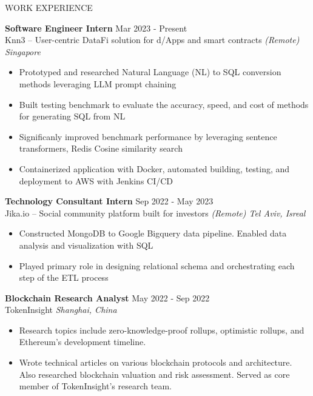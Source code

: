 \documentclass{cv} %
\begin{document}
\begin{rSection}{WORK EXPERIENCE}

	\textbf{Software Engineer Intern} \hfill Mar 2023 - Present\\
	Knn3 – User-centric DataFi solution for d/Apps and smart contracts  \hfill \textit{(Remote) Singapore}
	\begin{itemize}
		\item Prototyped and researched Natural Language (NL) to SQL conversion methods leveraging LLM prompt chaining
		\item Built testing benchmark to evaluate the accuracy, speed, and cost of methods for generating SQL from NL
		\item Significanly improved benchmark performance by leveraging sentence transformers, Redis Cosine similarity search
		\item Containerized application with Docker, automated building, testing, and deployment to AWS with Jenkins CI/CD
	\end{itemize}

	\textbf{Technology Consultant Intern} \hfill Sep 2022 - May 2023\\
	Jika.io – Social community platform built for investors \hfill \textit{(Remote) Tel Aviv, Isreal}
	\begin{itemize}
		\item Constructed MongoDB to Google Bigquery data pipeline. Enabled data analysis and visualization with SQL
		\item Played primary role in designing relational schema and orchestrating each step of the ETL process
	\end{itemize}

	\textbf{Blockchain Research Analyst} \hfill May 2022 - Sep 2022 \\
	TokenInsight \hfill \textit{Shanghai, China}
	\begin{itemize}
		\item Research topics include zero-knowledge-proof rollups, optimistic rollups, and Ethereum’s development timeline.
		\item Wrote technical articles on various blockchain protocols and architecture. Also researched blockchain valuation and risk assessment. Served as core member of TokenInsight’s research team.
	\end{itemize}

\end{rSection}
\end{document}

